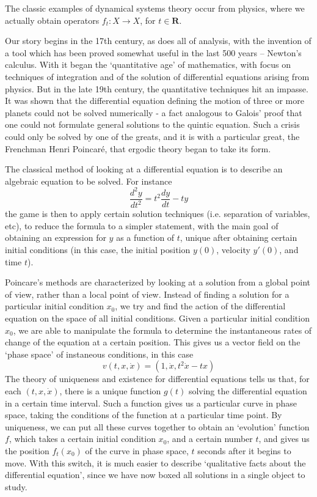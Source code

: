 \documentclass[12pt]{report}
\theoremstyle{plain}
\theoremstyle{definition}
\begin{document}
The classic examples of dynamical systems theory occur from physics, where we actually obtain operators $f_t:X \to X$, for $t \in \mathbf{R}$. 

Our story begins in the 17th century, as does all of analysis, with the invention of a tool which has been proved somewhat useful in the last 500 years -- Newton's calculus. With it began the `quantitative age' of mathematics, with focus on techniques of integration and of the solution of differential equations arising from physics. But in the late 19th century, the quantitative techniques hit an impasse. It was shown that the differential equation defining the motion of three or more planets could not be solved numerically - a fact analogous to Galois' proof that one could not formulate general solutions to the quintic equation. Such a crisis could only be solved by one of the greats, and it is with a particular great, the Frenchman Henri Poincar\'{e}, that ergodic theory began to take its form.

The classical method of looking at a differential equation is to describe an algebraic equation to be solved. For instance
%
\[ \frac{d^2 y}{dt^2} = t^2 \frac{dy}{dt} - ty \]
%
the game is then to apply certain solution techniques (i.e. separation of variables, etc), to reduce the formula to a simpler statement, with the main goal of obtaining an expression for $y$ as a function of $t$, unique after obtaining certain initial conditions (in this case, the initial position $y(0)$, velocity $y'(0)$, and time $t$).

Poincare's methods are characterized by looking at a solution from a global point of view, rather than a local point of view. Instead of finding a solution for a particular initial condition $x_0$, we try and find the action of the differential equation on the space of all initial conditions. Given a particular initial condition $x_0$, we are able to manipulate the formula to determine the instantaneous rates of change of the equation at a certain position. This gives us a vector field on the `phase space' of instaneous conditions, in this case
%
\[ v(t,x,\dot{x}) = (1,\dot{x},t^2 \dot{x} - tx) \]
%
The theory of uniqueness and existence for differential equations tells us that, for each $(t,x,\dot{x})$, there is a unique function $g(t)$ solving the differential equation in a certain time interval. Such a function gives us a particular curve in phase space, taking the conditions of the function at a particular time point. By uniqueness, we can put all these curves together to obtain an `evolution' function $f$, which takes a certain initial condition $x_0$, and a certain number $t$, and gives us the position $f_t(x_0)$ of the curve in phase space, $t$ seconds after it begins to move. With this switch, it is much easier to describe `qualitative facts about the differential equation', since we have now boxed all solutions in a single object to study.
\end{document}

